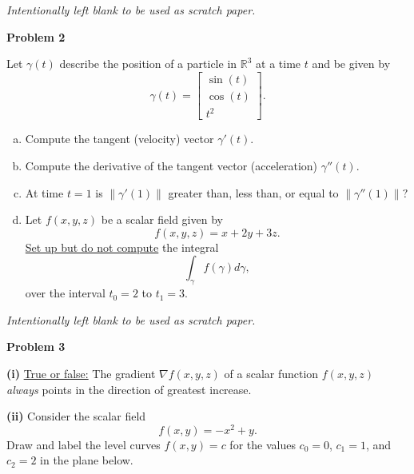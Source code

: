 \documentclass[12pt]{amsbook}
\newcommand{\R}{\mathbb{R}}
\begin{document}
    \newpage
\emph{Intentionally left blank to be used as scratch paper.}\\









\newpage

\textbf{Problem 2}

\vspace{.25cm}

Let $\gamma(t)$ describe the position of a particle in $\R^3$ at a time $t$ and be given by
\[
\gamma(t) = \begin{bmatrix} \sin(t) \\ \cos(t) \\ t^2 \end{bmatrix}.
\]
\begin{enumerate}[(a)]
    \item Compute the tangent (velocity) vector $\gamma'(t)$.  
    \vspace*{3.5cm}
    \item Compute the derivative of the tangent vector (acceleration) $\gamma''(t)$.
    \vspace*{3.5cm}
    \item At time $t=1$ is $\|\gamma'(1)\|$ greater than, less than, or equal to $\|\gamma''(1)\|?$
    \vspace*{4cm}
    \item Let $f(x,y,z)$ be a scalar field given by
    \[
    f(x,y,z) = x+2y+3z.
    \]
    \underline{Set up but do not compute} the integral
    \[
    \int_\gamma f(\gamma)d\gamma,
    \]
    over the interval $t_0=2$ to $t_1=3$.
\end{enumerate}

\newpage
\emph{Intentionally left blank to be used as scratch paper.}\\






\newpage

\textbf{Problem 3}

\vspace{.25cm}

\textbf{(i)} \underline{True or false:} The gradient $\nabla f(x,y,z)$ of a scalar function $f(x,y,z)$ \emph{always} points in the direction of greatest increase.
\vspace*{1cm}

\textbf{(ii)} Consider the scalar field 
\[
f(x,y) = -x^2+y.
\]
Draw and label the level curves $f(x,y)=c$ for the values $c_0=0$, $c_1=1$, and $c_2=2$ in the plane below.
\end{document}
